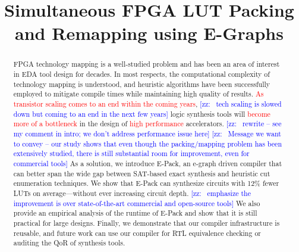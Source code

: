 \documentclass[10pt,conference]{IEEEtran}
\newcommand{\fullname}{Simultaneous FPGA LUT Packing and Remapping using E-Graphs}
\newcommand{\metric}{12\% fewer LUTs}
\newcommand{\fixme}[1]{\textcolor{red}{#1}}
\newcommand{\zz}[1]{\textcolor{blue}{[\small zz: ~#1]}}
\begin{document}
\title{\fullname}
\author{}
\maketitle

\begin{abstract}
    FPGA technology mapping is a well-studied problem and has been an area of
    interest in EDA tool design for decades. In most respects, the computational
    complexity of technology mapping is understood, and heuristic algorithms have
    been successfully employed to mitigate compile times while maintaining high
    quality of results. \fixme{As transistor scaling comes to an end within the coming
        years}, \zz{tech scaling is slowed down but coming to an end in the next few years} logic synthesis tools will \fixme{become more of a bottleneck} in the design of
    \fixme{high performance} accelerators. \zz{rewrite -- see my comment in intro; we don't address performance issue here} \zz{Message we want to convey -- our study shows that even though the packing/mapping problem has been extensively studied, there is still substantial room for improvement, even for commercial tools} As a solution, we introduce E-Pack, an e-graph
    driven compiler that can better span the wide gap between SAT-based
    exact synthesis and heuristic cut enumeration techniques. We show that E-Pack
    can synthesize circuits with \metric{} on average---without ever
    increasing circuit depth. \zz{emphasize the improvement is over state-of-the-art commercial and open-source tools} We also provide an empirical analysis of the runtime
    of E-Pack and show that it is still practical for large designs. Finally, we
    demonstrate that our compiler infrastructure is reusable, and future work can
    use our compiler for RTL equivalence checking or auditing the QoR of synthesis
    tools.
\end{abstract}















\end{document}
